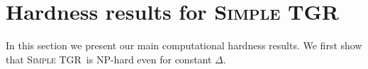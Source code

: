 \documentclass[a4paper,UKenglish,cleveref, autoref, thm-restate, anonymous]{lipics-v2021}
\newcommand{\ie}{i.\,e.,\ }
\newcommand{\deltaExact}{\textsc{Simple TGR}}
\newcommand{\kDeltaExact}{\textsc{$(k,\Delta)$-TGR}}
\begin{document}

\section{Hardness results for \deltaExact}  
In this section we present our main computational hardness results.  
We first show that \deltaExact\ is NP-hard even for constant $\Delta$. 
\end{document}
